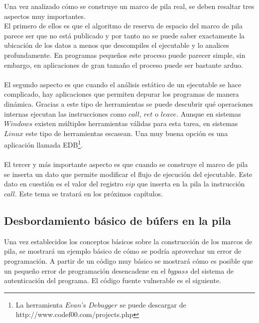 \documentclass [titlepage, 12pt]{article}
\begin{document}
Una vez analizado c\'omo se construye un marco de pila real, se deben resaltar tres aspectos muy importantes.\\
El primero de ellos es que el algoritmo de reserva de espacio del marco de pila parece ser que no est\'a publicado y por tanto no se puede saber exactamente la ubicaci\'on de los datos a menos que descompiles el ejecutable y lo analices profundamente. En programas peque\~nos este proceso puede parecer simple, sin embargo, en aplicaciones de gran tama\~no el proceso puede ser bastante arduo.\\
\\
El segundo aspecto es que cuando el an\'alisis est\'atico de un ejecutable se hace complicado, hay aplicaciones que permiten depurar los programas de manera din\'amica. Gracias a este tipo de herramientas se puede descubrir qu\'e operaciones internas ejecutan las instrucciones como $call$, $ret$ o $leave$. Aunque en sistemas $Windows$ existen m\'ultiples herramientas v\'alidas para esta tarea, en sistemas $Linux$ este tipo de herramientas escasean. Una muy buena opci\'on es una aplicaci\'on llamada EDB\footnote{La herramienta $Evan$'s $Debugger$ se puede descargar de http://www.codef00.com/projects.php}.\\
\\
El tercer y m\'as importante aspecto es que cuando se construye el marco de pila se inserta un dato que permite modificar el flujo de ejecuci\'on del ejecutable. Este dato en cuesti\'on es el valor del registro $eip$ que inserta en la pila la instrucci\'on $call$. Este tema se tratar\'a en los pr\'oximos cap\'itulos.

\subsection{Desbordamiento b\'asico de b\'ufers en la pila}

Una vez establecidos los conceptos b\'asicos sobre la construcci\'on de los marcos de pila, se mostrar\'a un ejemplo b\'asico de c\'omo se podr\'ia aprovechar un error de programaci\'on. A partir de un c\'odigo muy b\'asico se mostrar\'a c\'omo es posible que un peque\~no error de programaci\'on desencadene en el $bypass$ del sistema de autenticaci\'on del programa. El c\'odigo fuente vulnerable es el siguiente.\\
\end{document}

